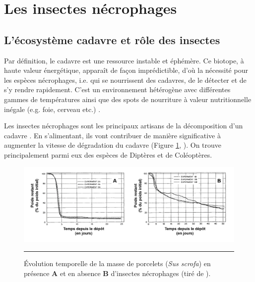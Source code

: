 \clearpage

\section{Les insectes nécrophages}



	\subsection{L'écosystème cadavre et rôle des insectes}
Par définition, le cadavre est une ressource instable et éphémère. Ce biotope, à haute valeur énergétique, apparaît de façon imprédictible, d'où la nécessité pour les espèces nécrophages, i.e. qui se nourrissent des cadavres, de le détecter et de s'y rendre rapidement. C'est un environnement hétérogène avec différentes gammes de températures ainsi que des spots de nourriture à valeur nutritionnelle inégale (e.g. foie, cerveau etc.) \cite{ireland_effects_2006}.

Les insectes nécrophages sont les principaux artisans de la décomposition d'un cadavre \citep{marchenko_medico-legal_1988, payne_summer_1965}. En s'alimentant, ils vont contribuer de manière significative à augmenter la vitesse de dégradation du cadavre (Figure \ref{fig:degradation}, \cite{payne_summer_1965}). On trouve principalement parmi eux des espèces de Diptères et de Coléoptères.   

\begin{figure}[ht]
\centering
		\includegraphics[width=0.85 \textwidth]{Figures/degradation.png}
		\rule{35em}{0.5pt}
		\caption[Degradation]{Évolution temporelle de la masse de porcelets (\textit{Sus scrofa}) en présence \textbf{A} et en absence \textbf{B} d'insectes nécrophages (tiré de \citet{payne_summer_1965}).}
	\label{fig:degradation}
\end{figure}



